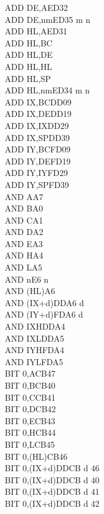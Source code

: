\documentclass[12pt,twoside,openright,a4paper]{book}
\begin{document}
\begin{multicols}{3}
{\begin{tabbing}
		ADD DE,A\ZXN\>ED32\\
		ADD DE,nm\ZXN\>ED35 m n\\
		ADD HL,A\ZXN\>ED31\\
		ADD HL,BC\\
		ADD HL,DE\\
		ADD HL,HL\\
		ADD HL,SP\\
		ADD HL,nm\ZXN\>ED34 m n\\
		ADD IX,BC\>DD09\\
		ADD IX,DE\>DD19\\
		ADD IX,IX\>DD29\\
		ADD IX,SP\>DD39\\
		ADD IY,BC\>FD09\\
		ADD IY,DE\>FD19\\
		ADD IY,IY\>FD29\\
		ADD IY,SP\>FD39\\
		AND A\>A7\\
		AND B\>A0\\
		AND C\>A1\\
		AND D\>A2\\
		AND E\>A3\\
		AND H\>A4\\
		AND L\>A5\\
		AND n\>E6 n\\
		AND (HL)\>A6\\
		AND (IX+d)\>DDA6 d\\
		AND (IY+d)\>FDA6 d\\
		AND IXH\UNDOC\>DDA4\\
		AND IXL\UNDOC\>DDA5\\
		AND IYH\UNDOC\>FDA4\\
		AND IYL\UNDOC\>FDA5\\
		BIT 0,A\>CB47\\
		BIT 0,B\>CB40\\
		BIT 0,C\>CB41\\
		BIT 0,D\>CB42\\
		BIT 0,E\>CB43\\
		BIT 0,H\>CB44\\
		BIT 0,L\>CB45\\
		BIT 0,(HL)\>CB46\\
		BIT 0,(IX+d)\>DDCB d 46\\
		BIT 0,(IX+d)\UNDOC\>DDCB d 40\\
		BIT 0,(IX+d)\UNDOC\>DDCB d 41\\
		BIT 0,(IX+d)\UNDOC\>DDCB d 42\\

\end{tabbing}}
\end{multicols}
\end{document}
